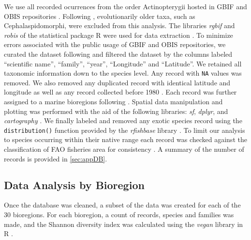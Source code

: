 \documentclass[12pt,authoryear]{elsarticle}
\begin{document}
We use all recorded ocurrences from the order Actinopterygii hosted in GBIF and OBIS repositories \citep{GBIFdata,OBISdata}. Following \cite{alo2021macroecology}, evolutionarily older taxa, such as Cephalaspidomorphi, were excluded from this analysis. The libraries \textit{rgbif} and \textit{robis} of the statistical package R were used for data extraction \citep{chamberlain2017, provoost2020, rcore2018}. To minimize errors associated with the public usage of GBIF and OBIS repositories, we curated the dataset following \cite{zizka2020} and filtered the dataset by the columns labeled ``scientific name'', ``family'', ``year'', ``Longitude'' and ``Latitude''. We retained all taxonomic information down to the species level. Any record with \texttt{NA} values was removed. We also removed any duplicated record with identical latitude and longitude as well as any record collected before 1980 \citep[see][]{alo2021macroecology,garcia2015}. Each record was further assigned to a marine bioregions following  \cite{costello2017marine}. Spatial data manipulation and plotting was performed with the aid of the following libraries: \textit{sf}, \textit{dplyr}, and \textit{cartography} \citep{giraud2016cartography, pebesma2018simple, wickham2021dplyr}. We finally labeled and removed any exotic species record using the \texttt{distribution()} function provided by the \textit{rfishbase} library \citep{boettiger2012rfishbase, froese2021fishbase}. To limit our analysis to species occurring within their native range each record was checked against the classification of FAO fisheries area for consistency \citep{fao2014}. A summary of the number of records is provided in \ref{sec:appDB}.


\subsection{Data Analysis by Bioregion}
\label{sec:data-analysis}
Once the database was cleaned, a subset of the data was created for each of the 30 bioregions. For each bioregion, a count of records, species and families was made, and the Shannon diversity index was calculated using the \textit{vegan} library in R \citep{vegan}.
\end{document}
